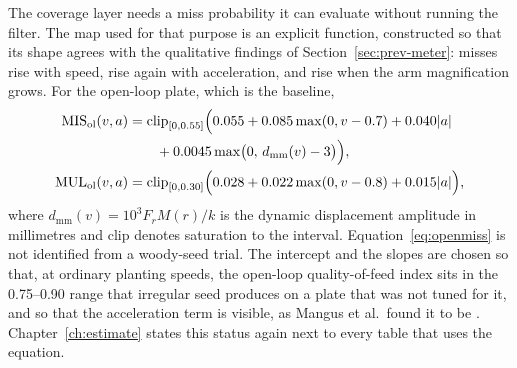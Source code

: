 The coverage layer needs a miss probability it can evaluate without running the filter. The map used for that purpose is an explicit function, constructed so that its shape agrees with the qualitative findings of Section~\ref{sec:prev-meter}: misses rise with speed, rise again with acceleration, and rise when the arm magnification grows. For the open-loop plate, which is the baseline,
\begin{equation}
\label{eq:openmiss}
\begin{aligned}
\mathrm{MIS}_{\mathrm{ol}}(v,a) &= \mathrm{clip}_{[0,0.55]}\Bigl(
0.055 + 0.085\max(0,v-0.7) + 0.040|a| \\
&\qquad + 0.0045\max\bigl(0,\, d_{\mathrm{mm}}(v)-3\bigr)\Bigr),\\
\mathrm{MUL}_{\mathrm{ol}}(v,a) &= \mathrm{clip}_{[0,0.30]}\Bigl(
0.028 + 0.022\max(0,v-0.8) + 0.015|a|\Bigr),
\end{aligned}
\end{equation}
where \(d_{\mathrm{mm}}(v) = 10^3 F_r M(r)/k\) is the dynamic displacement amplitude in millimetres and \(\mathrm{clip}\) denotes saturation to the interval. Equation~\eqref{eq:openmiss} is not identified from a woody-seed trial. The intercept and the slopes are chosen so that, at ordinary planting speeds, the open-loop quality-of-feed index sits in the \numrange{0.75}{0.90} range that irregular seed produces on a plate that was not tuned for it, and so that the acceleration term is visible, as Mangus et al.\ found it to be \cite{mangus2017}. Chapter~\ref{ch:estimate} states this status again next to every table that uses the equation.

